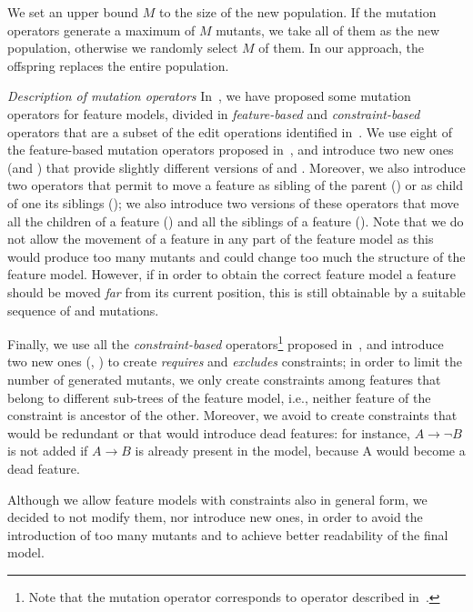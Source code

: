\begin{tikzborder}{\cite{Gargantini16:validation}}
\begin{tikzborder}{\cite{gargantini_combinatorial_2017}}
\begin{tikzborder}{\cite{garn2019}}
\begin{tikzborder}{\cite{arcaini2019achieving}}
	\bb We set an upper bound $M$ to the size of the new population. If the mutation operators generate a maximum of $M$ mutants, we take all of them as the new population, otherwise we randomly select $M$ of them. In our approach, the offspring replaces the entire population.
	
	{\it Description of mutation operators}
	In~\cite{icst2015}, we have proposed some mutation operators for feature models, divided in \textit{feature-based} and \textit{constraint-based} operators that are a subset of the edit operations identified in~\cite{Burdek2016}. We use eight of the feature-based mutation operators proposed in~\cite{icst2015}, and introduce two new ones (\OrToAndOpt and \AlToAndOpt) that provide slightly different versions of \OrToAnd and \AlToAnd. Moreover, we also introduce two operators that permit to move a feature as sibling of the parent (\PullUp) or as child of one its siblings (\PushDown); we also introduce two versions of these operators that move all the children of a feature (\PullUpChildren) and all the siblings of a feature (\PushDownSiblings). Note that we do not allow the movement of a feature in any part of the feature model as this would produce too many mutants and could change too much the structure of the feature model. However, if in order to obtain the correct feature model a feature should be moved {\it far} from its current position, this is still obtainable by a suitable sequence of \PullUp and \PushDown mutations.
	
	Finally, we use all the \textit{constraint-based} operators\footnote{Note that the mutation operator \DelConstr corresponds to operator \MC described in~\cite{icst2015}.} proposed in~\cite{icst2015}, and introduce two new ones (\Creq, \Cexc) to create {\it requires} and {\it excludes} constraints; in order to limit the number of generated mutants, we only create constraints among features that belong to different sub-trees of the feature model, i.e., neither feature of the constraint is ancestor of the other. Moreover, we avoid to create constraints that would be redundant or that would introduce dead features: for instance, $A \rightarrow \neg B$ is not added if $A \rightarrow B$ is already present in the model, because A would become a dead feature.
	
	Although we allow feature models with constraints also in general form, we decided to not modify them, nor introduce new ones, in order to avoid the introduction of too many mutants and to achieve better readability of the final model.
	

\end{tikzborder}
\end{tikzborder}
\end{tikzborder}
\end{tikzborder}
